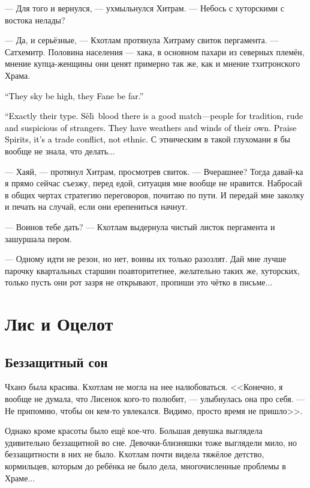 \documentclass[a4paper,10pt,fleqn]{book}\usepackage{cooltooltips}\usepackage{polyglossia}\setdefaultlanguage{english}\setotherlanguage{russian}\defaultfontfeatures{Ligatures=TeX,Mapping=tex-text} \usepackage{xcolor}\definecolor{lightgray}{HTML}{bbbbbb}\color{lightgray}\newcommand{\ml}[3]{\textcolor{black}{#3}}
\newcommand{\Seli}{S\r{e}l\={\i}}
\begin{document}
--- Для того и вернулся, --- ухмыльнулся Хитрам.
--- Небось с хуторскими с востока нелады?

--- Да, и серьёзные, --- Кхотлам протянула Хитраму свиток пергамента.
--- Сатхемитр.
Половина населения --- хака, в основном пахари из северных племён, мнение купца-женщины они ценят примерно так же, как и мнение тхитронского Храма.

\ml{$0$}
{--- Небо высоко, Храм далеко.}
{``They sky be high, they Fane be far.''}

\ml{$0$}
{--- Вот именно такие.}
{``Exactly their type.}
\ml{$0$}
{Те, что сели, под стать --- ревнители старины, грубые и подозрительные к чужакам.}
{\Seli\ blood there is a good match---people for tradition, rude and suspicious of strangers.}
\ml{$0$}
{У них своя погода и свои ветра.}
{They have weathers and winds of their own.}
\ml{$0$}
{Слава духам, конфликт не этнический, а торговый.}
{Praise Spirits, it's a trade conflict, not ethnic.}
С этническим в такой глухомани я бы вообще не знала, что делать...

--- Хаяй, --- протянул Хитрам, просмотрев свиток.
--- Вчерашнее?
Тогда давай-ка я прямо сейчас съезжу, перед едой, ситуация мне вообще не нравится.
Набросай в общих чертах стратегию переговоров, почитаю по пути.
И передай мне заколку и печать на случай, если они ерепениться начнут.

--- Воинов тебе дать? --- Кхотлам выдернула чистый листок пергамента и зашуршала пером.

--- Одному идти не резон, но нет, воины их только разозлят.
Дай мне лучше парочку квартальных старшин поавторитетнее, желательно таких же, хуторских, только пусть они рот зазря не открывают, пропиши это чётко в письме...

\chapter{Лис и Оцелот}

\section{Беззащитный сон}

Чханэ была красива.
Кхотлам не могла на нее налюбоваться.
<<Конечно, я вообще не думала, что Лисенок кого-то полюбит, --- улыбнулась она про себя.
--- Не припомню, чтобы он кем-то увлекался.
Видимо, просто время не пришло>>.

Однако кроме красоты было ещё кое-что.
Большая девушка выглядела удивительно беззащитной во сне.
Девочки-близняшки тоже выглядели мило, но беззащитности в них не было.
Кхотлам почти видела тяжёлое детство, кормильцев, которым до ребёнка не было дела, многочисленные проблемы в Храме...
\end{document}

